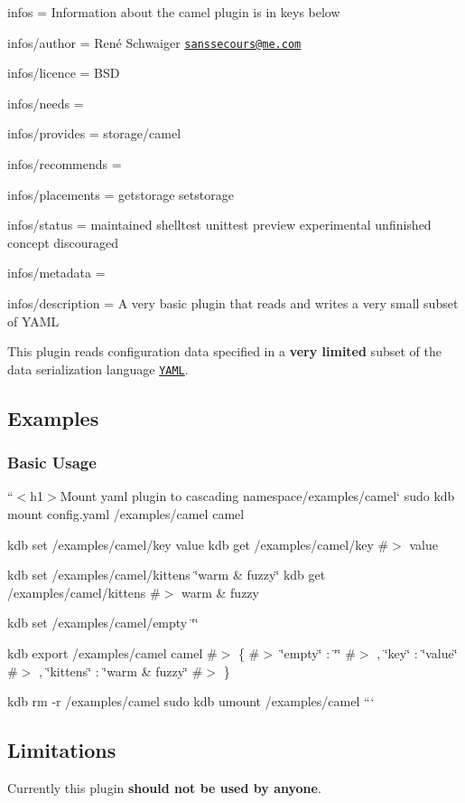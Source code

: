 
\begin{DoxyItemize}
\item infos = Information about the camel plugin is in keys below
\item infos/author = René Schwaiger \href{mailto:sanssecours@me.com}{\tt sanssecours@me.\+com}
\item infos/licence = B\+SD
\item infos/needs =
\item infos/provides = storage/camel
\item infos/recommends =
\item infos/placements = getstorage setstorage
\item infos/status = maintained shelltest unittest preview experimental unfinished concept discouraged
\item infos/metadata =
\item infos/description = A very basic plugin that reads and writes a very small subset of Y\+A\+ML
\end{DoxyItemize}

This plugin reads configuration data specified in a {\bfseries very limited} subset of the data serialization language \href{http://www.yaml.org}{\tt Y\+A\+ML}.

\subsection*{Examples}

\subsubsection*{Basic Usage}

``{\ttfamily  $<$h1$>$Mount yaml plugin to cascading namespace}/examples/camel` sudo kdb mount config.\+yaml /examples/camel camel

kdb set /examples/camel/key value kdb get /examples/camel/key \#$>$ value

kdb set /examples/camel/kittens \char`\"{}warm \& fuzzy\char`\"{} kdb get /examples/camel/kittens \#$>$ warm \& fuzzy

kdb set /examples/camel/empty \char`\"{}\char`\"{}

kdb export /examples/camel camel \#$>$ \{ \#$>$ \char`\"{}empty\char`\"{} \+: \char`\"{}\char`\"{} \#$>$ , \char`\"{}key\char`\"{} \+: \char`\"{}value\char`\"{} \#$>$ , \char`\"{}kittens\char`\"{} \+: \char`\"{}warm \& fuzzy\char`\"{} \#$>$ \}

kdb rm -\/r /examples/camel sudo kdb umount /examples/camel ```

\subsection*{Limitations}

Currently this plugin {\bfseries should not be used by anyone}. 